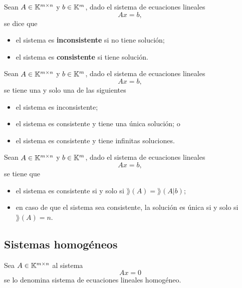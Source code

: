 \documentclass[a4,11pt]{aleph-notas}
\begin{document}
\begin{defi}
    Sean $A\in \Mat[\K]{m}{n}$ y $b\in \K^m$, dado el sistema de ecuaciones lineales
    \[
        Ax=b,
    \]
    se dice que
    \begin{itemize}
    \item
        el sistema es \textbf{inconsistente} si no tiene solución;
    \item
        el sistema es \textbf{consistente} si tiene solución.
    \end{itemize}
\end{defi}

\begin{teo}
    Sean $A\in \Mat[\K]{m}{n}$ y $b\in \K^m$, dado el sistema de ecuaciones lineales
    \[
        Ax=b,
    \]
    se tiene una y solo una de las siguientes
    \begin{itemize}
    \item
        el sistema es inconsistente;
    \item
        el sistema es consistente y tiene una única solución; o
    \item
        el sistema es consistente y tiene infinitas soluciones.
    \end{itemize}
\end{teo}


\begin{teo}
    Sean $A\in \Mat[\K]{m}{n}$ y $b\in \K^m$, dado el sistema de ecuaciones lineales
    \[
        Ax=b,
    \]
    se tiene que
    \begin{itemize}
    \item
        el sistema es consistente si y solo si $\rang(A)=\rang(A|b)$;
    \item
        en caso de que el sistema sea consistente, la solución es única si y solo si $\rang(A)=n$.
    \end{itemize}
\end{teo}

\subsection{Sistemas homogéneos}

\begin{defi}
    Sea $A\in \Mat[\K]{m}{n}$ al sistema
    \[ 
        Ax = 0
    \]
    se lo denomina sistema de ecuaciones lineales homogéneo.
\end{defi}
\end{document}
